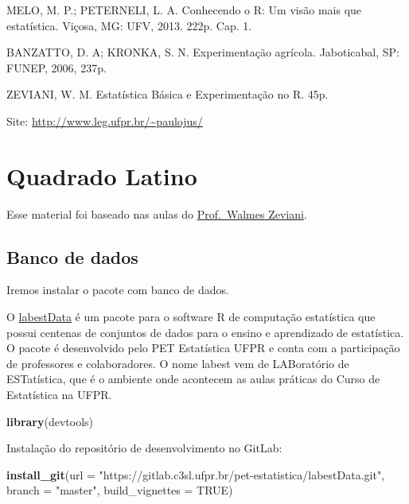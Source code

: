 \documentclass[
]{book}
\newenvironment{Shaded}{\begin{snugshade}}{\end{snugshade}}
\newcommand{\DataTypeTok}[1]{\textcolor[rgb]{0.13,0.29,0.53}{#1}}
\newcommand{\KeywordTok}[1]{\textcolor[rgb]{0.13,0.29,0.53}{\textbf{#1}}}
\newcommand{\NormalTok}[1]{#1}
\newcommand{\OtherTok}[1]{\textcolor[rgb]{0.56,0.35,0.01}{#1}}
\newcommand{\StringTok}[1]{\textcolor[rgb]{0.31,0.60,0.02}{#1}}
\begin{document}
MELO, M. P.; PETERNELI, L. A. Conhecendo o R: Um visão mais que estatística. Viçosa, MG: UFV, 2013. 222p. Cap. 1.

BANZATTO, D. A; KRONKA, S. N. Experimentação agrícola. Jaboticabal, SP: FUNEP, 2006, 237p.

ZEVIANI, W. M. Estatística Básica e Experimentação no R. 45p.

Site: \url{http://www.leg.ufpr.br/~paulojus/}

\hypertarget{quadrado-latino}{%
\section{Quadrado Latino}\label{quadrado-latino}}

Esse material foi baseado nas aulas do \href{https://www.youtube.com/user/walmes}{Prof.~Walmes Zeviani}.

\hypertarget{banco-de-dados}{%
\subsection{Banco de dados}\label{banco-de-dados}}

Iremos instalar o pacote com banco de dados.

O \href{https://gitlab.c3sl.ufpr.br/pet-estatistica/labestData\#descrio}{labestData} é um pacote para o software R de computação estatística que possui centenas de conjuntos de dados para o ensino e aprendizado de estatística. O pacote é desenvolvido pelo PET Estatística UFPR e conta com a participação de professores e colaboradores. O nome
labest vem de LABoratório de ESTatística, que é o ambiente onde acontecem as aulas práticas do Curso de Estatística na UFPR.

\begin{Shaded}
\begin{Highlighting}[]
\KeywordTok{library}\NormalTok{(devtools)}
\end{Highlighting}
\end{Shaded}

Instalação do repositório de desenvolvimento no GitLab:

\begin{Shaded}
\begin{Highlighting}[]
\KeywordTok{install_git}\NormalTok{(}\DataTypeTok{url =} \StringTok{"https://gitlab.c3sl.ufpr.br/pet-estatistica/labestData.git"}\NormalTok{,}
            \DataTypeTok{branch =} \StringTok{"master"}\NormalTok{, }\DataTypeTok{build_vignettes =} \OtherTok{TRUE}\NormalTok{)}
\end{Highlighting}
\end{Shaded}
\end{document}
